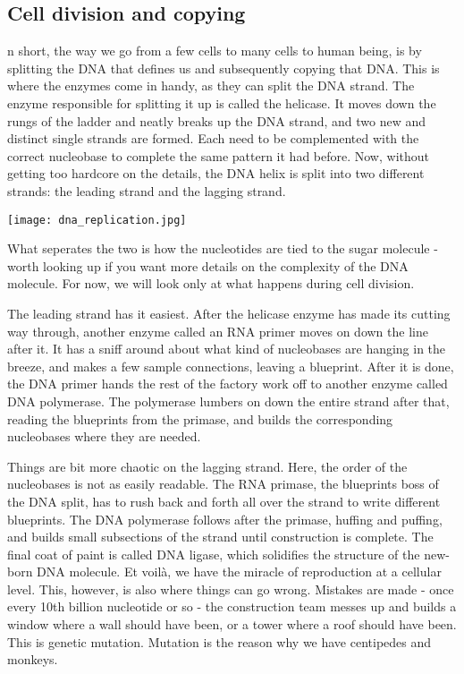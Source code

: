 \subsection{Cell division and copying}
n short, the way we go from a few cells to many cells to human being, is by splitting the DNA that defines us and subsequently copying that DNA.
This is where the enzymes come in handy, as they can split the DNA strand.
The enzyme responsible for splitting it up is called the helicase.
It moves down the rungs of the ladder and neatly breaks up the DNA strand, and two new and distinct single strands are formed.
Each need to be complemented with the correct nucleobase to complete the same pattern it had before.
Now, without getting too hardcore on the details, the DNA helix is split into two different strands: the leading strand and the lagging strand.\cite{hankgreen}

\begin{center}
	\texttt{[image: dna\_replication.jpg]}
\end{center}


What seperates the two is how the nucleotides are tied to the sugar molecule - worth looking up if you want more details on the complexity of the DNA molecule.\cite{lewontin}
For now, we will look only at what happens during cell division.

The leading strand has it easiest.
After the helicase enzyme has made its cutting way through, another enzyme called an RNA primer moves on down the line after it.
It has a sniff around about what kind of nucleobases are hanging in the breeze, and makes a few sample connections, leaving a blueprint.
After it is done, the DNA primer hands the rest of the factory work off to another enzyme called DNA polymerase.
The polymerase lumbers on down the entire strand after that, reading the blueprints from the primase, and builds the corresponding nucleobases where they are needed. 

Things are bit more chaotic on the lagging strand.
Here, the order of the nucleobases is not as easily readable.
The RNA primase, the blueprints boss of the DNA split, has to rush back and forth all over the strand to write different blueprints.
The DNA polymerase follows after the primase, huffing and puffing, and builds small subsections of the strand until construction is complete.
The final coat of paint is called DNA ligase, which solidifies the structure of the new-born DNA molecule.
Et voilà, we have the miracle of reproduction at a cellular level.\cite{hankgreen}
This, however, is also where things can go wrong.
Mistakes are made - once every 10th billion nucleotide or so - the construction team messes up and builds a window where a wall should have been, or a tower where a roof should have been.
This is genetic mutation.
Mutation is the reason why we have centipedes and monkeys.